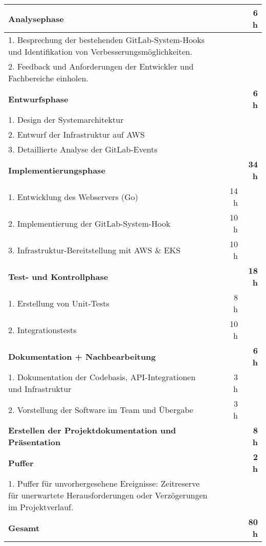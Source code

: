 \begin{tabularx}{\textwidth}{Xrrr}
    \hline
    \rowcolor{white}\textbf{Analysephase} & \textbf{} & \textbf{} & \textbf{6 h} \\ 
    \hline
    1. Besprechung der bestehenden GitLab-System-Hooks und Identifikation von Verbesserungsmöglichkeiten. &       &  &  \\ 
    \rowcolor{odd}2. Feedback und Anforderungen der Entwickler und Fachbereiche einholen. &       &  &  \\ 
    \rowcolor{white}\textbf{Entwurfsphase} & \textbf{} & \textbf{} & \textbf{6 h} \\ 
    \hline
    1. Design der Systemarchitektur &       &  &  \\ 
    \rowcolor{odd}2. Entwurf der Infrastruktur auf AWS &       &  &  \\ 
    3. Detaillierte Analyse der GitLab-Events &       &  &  \\ 
    \rowcolor{white}\textbf{Implementierungsphase} & \textbf{} & \textbf{} & \textbf{34 h} \\ 
    \hline
    1. Entwicklung des Webservers (Go) &       & 14 h &  \\ 
    \rowcolor{odd}2. Implementierung der GitLab-System-Hook &       & 10 h &  \\ 
    3. Infrastruktur-Bereitstellung mit AWS \& EKS &       & 10 h &  \\ 
    \rowcolor{white}\textbf{Test- und Kontrollphase} & \textbf{} & \textbf{} & \textbf{18 h} \\ 
    \hline
    1. Erstellung von Unit-Tests &       & 8 h &  \\ 
    \rowcolor{odd}2. Integrationstests &       & 10 h &  \\ 
    \rowcolor{white}\textbf{Dokumentation + Nachbearbeitung} & \textbf{} & \textbf{} & \textbf{6 h} \\ 
    \hline
    1. Dokumentation der Codebasis, API-Integrationen und Infrastruktur &       & 3 h &  \\ 
    \rowcolor{odd}2. Vorstellung der Software im Team und Übergabe &       & 3 h &  \\ 
    \rowcolor{white}\textbf{Erstellen der Projektdokumentation und Präsentation} & \textbf{} & \textbf{} & \textbf{8 h} \\ 
    \hline
    \rowcolor{white}\textbf{Puffer} & \textbf{} & \textbf{} & \textbf{2 h} \\ 
    \hline
    1. Puffer für unvorhergesehene Ereignisse: Zeitreserve für unerwartete Herausforderungen oder Verzögerungen im Projektverlauf. &       &  &  \\ 
    \hline
    \hline
    \rowcolor{white}\textbf{Gesamt} & \textbf{} & \textbf{} & \textbf{80 h} \\ 
    \hline
\end{tabularx}
    